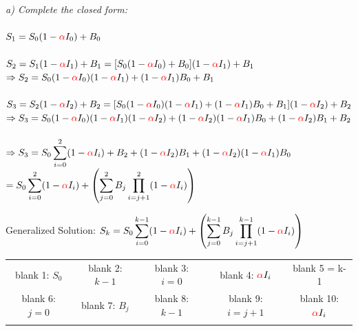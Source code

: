 \documentclass[12pt]{article}
\begin{document}
\textit{a) Complete the closed form:}\\\\
\normalsize $S_1 = S_0(1 - \textcolor{red} {\alpha} I_0) + B_0$\\\\
$S_2 = S_1(1 - \textcolor{red} {\alpha} I_1) + B_1 = [S_0(1 - \textcolor{red} {\alpha} I_0) + B_0](1 - \textcolor{red} {\alpha} I_1) + B_1$\\
$\Rightarrow S_2 = S_0(1 - \textcolor{red} {\alpha} I_0)(1 - \textcolor{red} {\alpha} I_1) + (1 - \textcolor{red} {\alpha} I_1)B_0 + B_1$\\\\
$S_3 = S_2(1 - \textcolor{red} {\alpha} I_2) + B_2 =  [S_0(1 - \textcolor{red} {\alpha} I_0)(1 - \textcolor{red} {\alpha} I_1) + (1 - \textcolor{red} {\alpha} I_1)B_0 + B_1](1 - \textcolor{red} {\alpha} I_2) + B_2$\\
$\Rightarrow S_3 = S_0(1 - \textcolor{red} {\alpha} I_0)(1 - \textcolor{red} {\alpha} I_1)(1 - \textcolor{red} {\alpha} I_2) + (1 - \textcolor{red} {\alpha} I_2)(1 - \textcolor{red} {\alpha} I_1)B_0 +(1 - \textcolor{red} {\alpha} I_2)B_1 + B_2$\\\\
$\Rightarrow S_3 = S_0 \displaystyle\sum^{2}_{i=0}(1 - \textcolor{red} {\alpha} I_i) + B_2 + (1 - \textcolor{red} {\alpha} I_2)B_1 + (1 -\textcolor{red} {\alpha} I_2)(1 - \textcolor{red} {\alpha} I_1)B_0$\\
\hphantom{sjssfa} $= S_0\displaystyle\sum^{2}_{i=0}(1 - \textcolor{red} {\alpha} I_i) + \left( \displaystyle\sum^{2}_{j=0} B_j \displaystyle \prod^{2}_{i=j+1}(1 - \textcolor{red} {\alpha} I_{i})\right)$\\
\begin{center}
Generalized Solution:
$S_k = S_0 \displaystyle\sum^{k-1}_{i=0}(1 - \textcolor{red} {\alpha} I_i) + \left(\displaystyle\sum^{k-1}_{j=0}B_{j}\displaystyle \prod^{k-1}_{i=j+1}(1 - \textcolor{red} {\alpha} I_{i})\right)$\\
\end{center}
\begin{center}
\begin{tabular}{ c c c c c} 
blank 1:  $S_0$ & blank 2: $k-1$ & blank 3: $i = 0$ & blank 4: $\textcolor{red} {\alpha} I_i$  & blank 5 = k-1\\ 
blank 6: $j=0$ & blank 7: $B_{j}$ & blank 8: $k - 1$ & blank 9: $i = j + 1$ &blank 10: $\textcolor{red} {\alpha} I_{i}$ \\\\
\end{tabular}
\end{center}
\end{document}
